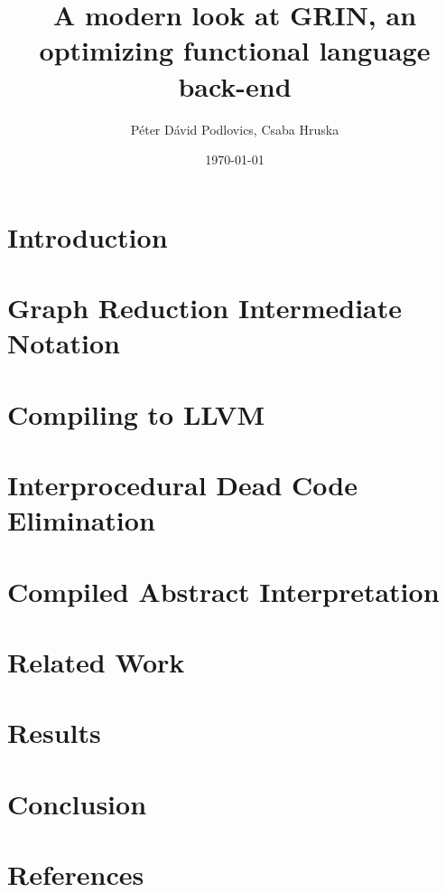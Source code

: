 \documentclass[10pt,a4paper,oneside]{article}
\title{A modern look at GRIN, an optimizing functional language back-end}
\date{\today}
\author{Péter Dávid Podlovics, Csaba Hruska}
\begin{document}
	
	
	
	\tableofcontents
	
	\section{Introduction} \label{sec-intro}
	
	
	\section{Graph Reduction Intermediate Notation}
	
	
	\section{Compiling to LLVM}
	
	
	\section{Interprocedural Dead Code Elimination}
	
	
	\section{Compiled Abstract Interpretation}
	\section{Related Work}
	\section{Results}
	\section{Conclusion}
	\section{References}
	
	

	
\end{document}
